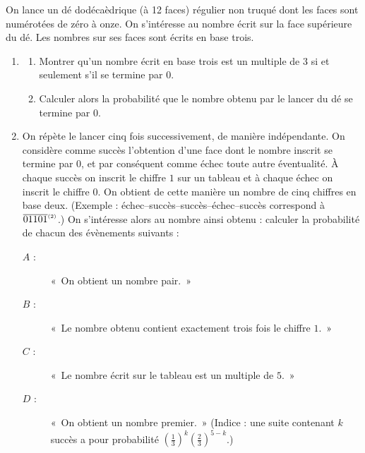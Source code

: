 \begin{exo}
\label{exo:pb de base trois}
	On lance un d\'e dod\'eca\`edrique (\`a 12 faces) r\'egulier non truqu\'e dont
	les faces sont num\'erot\'ees de z\'ero \`a onze.
	On s'int\'eresse au nombre \'ecrit sur la face sup\'erieure du d\'e.
	Les nombres sur ses faces sont \'ecrits en base trois.
	\begin{enumerate}
		\item
			\begin{enumerate}
				\item Montrer qu'un nombre \'ecrit en base trois est un multiple de $3$ si et seulement s'il se termine par $0$.
				\item Calculer alors la probabilit\'e que le nombre obtenu par le lancer du d\'e se termine par $0$.
			\end{enumerate}
		\item On r\'ep\`ete le lancer cinq fois successivement, de mani\`ere ind\'ependante.
			On consid\`ere comme succ\`es l'obtention d'une face dont le nombre inscrit se termine par $0$,
			et par cons\'equent comme \'echec toute autre \'eventualit\'e.
			\`A chaque succ\`es on inscrit le chiffre $1$ sur un tableau et \`a chaque \'echec on inscrit le chiffre $0$.
			On obtient de cette mani\`ere un nombre de cinq chiffres en base deux.
			(Exemple : \'echec--succ\`es--succ\`es--\'echec--succ\`es correspond \`a $\overline{01101}^{_{(2)}}$.)
			On s'int\'eresse alors au nombre ainsi obtenu :
			calculer la probabilit\'e de chacun des \'ev\`enements suivants :
			\begin{description}
				\item[$A$ :] «~On obtient un nombre pair.~»
				\item[$B$ :] «~Le nombre obtenu contient exactement trois fois le chiffre $1$.~»
				\item[$C$ :] «~Le nombre \'ecrit sur le tableau est un multiple de $5$.~»
				\item[$D$ :] «~On obtient un nombre premier.~»
				(Indice : une suite contenant $k$ succ\`es a pour probabilit\'e
				$\left(\frac{1}{3}\right)^k\left(\frac{2}{3}\right)^{5-k}$.)
			\end{description}
	\end{enumerate}
\end{exo}


